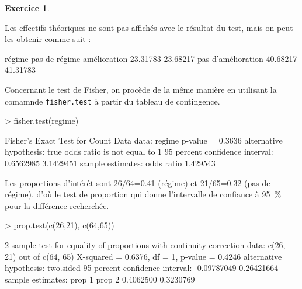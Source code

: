 \documentclass[11pt]{report}
\theoremstyle{definition}
\newtheorem{exo}{Exercice}[chapter]
\begin{document}
\begin{exo}
\begin{sol}
Les effectifs théoriques ne sont pas affichés avec le résultat du test, mais
on peut les obtenir comme suit :
\begin{Schunk}
\begin{Soutput}
                     régime pas de régime
amélioration       23.31783      23.68217
pas d'amélioration 40.68217      41.31783
\end{Soutput}
\end{Schunk}

Concernant le test de Fisher, on procède de la même manière en utilisant la
comamnde \texttt{fisher.test} à partir du tableau de contingence.
\begin{Schunk}
\begin{Sinput}
> fisher.test(regime)
\end{Sinput}
\begin{Soutput}
	Fisher's Exact Test for Count Data
data:  regime 
p-value = 0.3636
alternative hypothesis: true odds ratio is not equal to 1 
95 percent confidence interval:
 0.6562985 3.1429451 
sample estimates:
odds ratio 
  1.429543 
\end{Soutput}
\end{Schunk}

Les proportions d'intérêt sont 26/64=0.41 (régime) et 21/65=0.32 (pas de
régime), d'où le test de proportion qui donne l'intervalle de confiance à
95~\% pour la différence recherchée. 
\begin{Schunk}
\begin{Sinput}
> prop.test(c(26,21), c(64,65))
\end{Sinput}
\begin{Soutput}
	2-sample test for equality of proportions with continuity correction
data:  c(26, 21) out of c(64, 65) 
X-squared = 0.6376, df = 1, p-value = 0.4246
alternative hypothesis: two.sided 
95 percent confidence interval:
 -0.09787049  0.26421664 
sample estimates:
   prop 1    prop 2 
0.4062500 0.3230769 
\end{Soutput}
\end{Schunk}

\end{sol}
\end{exo}
%
%
\end{document}
